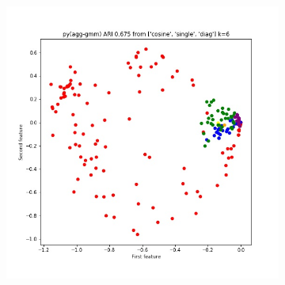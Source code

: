 \documentclass{article}
\begin{document}
\begin{figure}[h!]
\begin{subfigure}[b]{0.3\linewidth}
\end{subfigure} 
\begin{subfigure}[b]{0.3\linewidth}
  \includegraphics[width=\linewidth]{python_ari_k6.jpg}
\end{subfigure} 


\end{figure}
\end{document}
